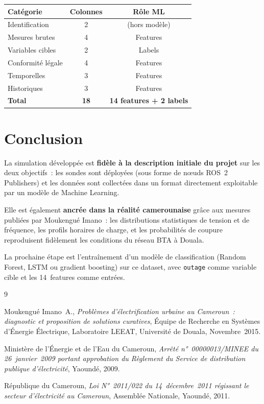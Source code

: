 \documentclass[12pt,a4paper]{article}
\begin{document}
\begin{center}
\begin{tabular}{lcc}
\toprule
\textbf{Catégorie} & \textbf{Colonnes} & \textbf{Rôle ML} \\
\midrule
Identification      & 2  & (hors modèle) \\
Mesures brutes      & 4  & Features \\
Variables cibles    & 2  & Labels \\
Conformité légale   & 4  & Features \\
Temporelles         & 3  & Features \\
Historiques         & 3  & Features \\
\midrule
\textbf{Total}      & \textbf{18} & \textbf{14 features + 2 labels} \\
\bottomrule
\end{tabular}
\end{center}

\section*{Conclusion}

La simulation développée est \textbf{fidèle à la description initiale du projet}
sur les deux objectifs~: les sondes sont déployées (sous forme de nœuds
ROS~2 Publishers) et les données sont collectées dans un format directement
exploitable par un modèle de Machine Learning.

Elle est également \textbf{ancrée dans la réalité camerounaise} grâce aux
mesures publiées par Moukengué Imano~: les distributions statistiques de
tension et de fréquence, les profils horaires de charge, et les probabilités
de coupure reproduisent fidèlement les conditions du réseau BTA à Douala.

La prochaine étape est l'entraînement d'un modèle de classification
(Random Forest, LSTM ou gradient boosting) sur ce dataset, avec
\texttt{outage} comme variable cible et les 14~features comme entrées.

\begin{thebibliography}{9}

  Moukengué Imano~A.,
  \textit{Problèmes d'électrification urbaine au Cameroun~:
  diagnostic et proposition de solutions curatives},
  Équipe de Recherche en Systèmes d'Énergie Électrique,
  Laboratoire LEEAT, Université de Douala, Novembre~2015.

  Ministère de l'Énergie et de l'Eau du Cameroun,
  \textit{Arrêté n°~00000013/MINEE du 26~janvier~2009 portant approbation
  du Règlement du Service de distribution publique d'électricité},
  Yaoundé, 2009.

  République du Cameroun,
  \textit{Loi N°~2011/022 du 14~décembre~2011 régissant le secteur
  d'électricité au Cameroun},
  Assemblée Nationale, Yaoundé, 2011.

\end{thebibliography}
\end{document}
